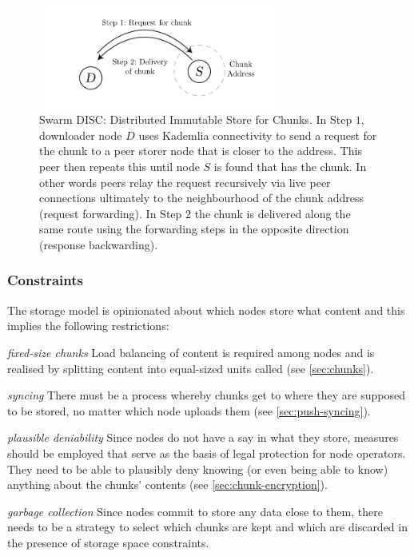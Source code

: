 \begin{figure}[htbp]
   \centering
   \includegraphics[width=0.7\textwidth]{fig/swarm disc_new.pdf}
   \caption[Swarm DISC: Distributed Immutable Store for Chunks \statusgreen]{Swarm DISC:  Distributed Immutable Store for Chunks. In Step $1$, downloader node $D$ uses Kademlia connectivity to send a request for the chunk to a peer storer node that is closer to the address. This peer then repeats this until node $S$ is found that has the chunk. In other words peers relay the request recursively via live peer connections ultimately to the neighbourhood of the chunk address (request forwarding). In Step $2$ the chunk is delivered along the same route using the forwarding steps in the opposite direction (response backwarding).}
   \label{fig:disc}
\end{figure}

\subsubsection{Constraints}
The  storage model is opinionated about which nodes store what content and this implies the following restrictions: 

\begin{labelledlist}
    \item[\emph{fixed-size chunks}] Load balancing of content is required among nodes and is realised by splitting content into equal-sized units called  (see \ref{sec:chunks}).
    \item[\emph{syncing}] There must be a process whereby chunks get to where they are supposed to be stored, no matter which node uploads them (see \ref{sec:push-syncing}).
    \item[\emph{plausible deniability}] Since nodes do not have a say in what they store, measures should be employed that serve as the basis of legal protection for node operators. They need to be able to plausibly deny knowing (or even being able to know) anything about the chunks' contents (see \ref{sec:chunk-encryption}).
    \item[\emph{garbage collection}] Since nodes commit to store any data close to them, there needs to be a strategy to select which chunks are kept and which are discarded in the presence of storage space constraints. 
\end{labelledlist}

